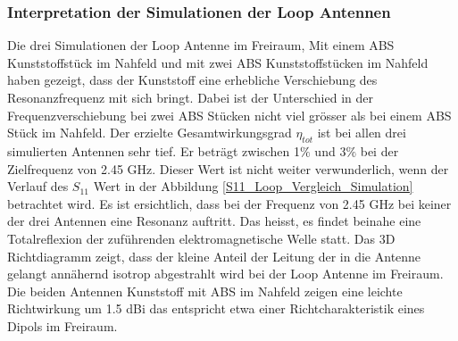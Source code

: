\subsubsection{Interpretation der Simulationen der Loop Antennen}
Die drei Simulationen der Loop Antenne im Freiraum, Mit einem ABS Kunststoffstück im Nahfeld und mit zwei ABS Kunststoffstücken im Nahfeld haben gezeigt, dass der Kunststoff eine erhebliche Verschiebung des Resonanzfrequenz mit sich bringt. Dabei ist der Unterschied in der Frequenzverschiebung bei zwei ABS Stücken nicht viel grösser als bei einem ABS Stück im Nahfeld. Der erzielte Gesamtwirkungsgrad $\eta_{tot}$ ist bei allen drei simulierten Antennen sehr tief. Er beträgt zwischen 1$\%$ und 3$\%$ bei der Zielfrequenz von 2.45 GHz.
Dieser Wert ist nicht weiter verwunderlich, wenn der Verlauf des $S_{11}$ Wert in der Abbildung \ref{S11_Loop_Vergleich_Simulation} betrachtet wird. Es ist ersichtlich, dass bei der Frequenz von 2.45 GHz bei keiner der drei Antennen eine Resonanz auftritt. Das heisst, es findet beinahe eine Totalreflexion der zuführenden elektromagnetische Welle statt. Das 3D Richtdiagramm zeigt, dass der kleine Anteil der Leitung der in die Antenne gelangt annähernd isotrop abgestrahlt wird bei der Loop Antenne im Freiraum. Die beiden Antennen Kunststoff mit ABS im Nahfeld zeigen eine leichte Richtwirkung um 1.5 dBi das entspricht etwa einer Richtcharakteristik eines Dipols im Freiraum.


\newpage
